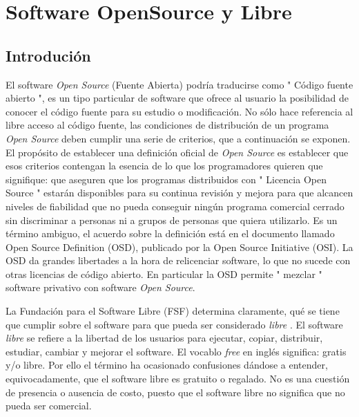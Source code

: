 \chapter{Software OpenSource y Libre}
\section{Introdución} 
	El software \textit{Open Source} (Fuente Abierta) podría traducirse como " Código fuente abierto ", es un tipo particular de software que ofrece al
	usuario la posibilidad de conocer el código fuente para su estudio o modificación. No sólo hace referencia al libre acceso al código fuente, las
	condiciones de distribución de un programa \textit{Open Source} deben cumplir una serie de criterios, que a continuación se exponen. El propósito de
	establecer una definición oficial de \textit{Open Source} es establecer que esos criterios contengan la esencia de lo que los programadores quieren que
	signifique: que aseguren que los programas distribuidos con " Licencia Open Source " estarán disponibles para su continua revisión y mejora para que
	alcancen niveles de fiabilidad que no pueda conseguir ningún programa comercial cerrado sin discriminar a personas ni a grupos de personas que
	quiera utilizarlo. Es un término ambiguo, el acuerdo sobre la definición está en el documento llamado Open Source Definition (OSD), publicado por la
	Open Source Initiative (OSI). La OSD da grandes libertades a la hora de relicenciar software, lo que no sucede con otras licencias de código
	abierto. En particular la OSD permite " mezclar " software privativo con software \textit{Open Source}.
	
	La Fundación para el Software Libre (FSF) determina claramente, qué se tiene que cumplir sobre el software para que pueda ser considerado
	\textit{libre} \cite{Etiqueta07}. El software \textit{libre} se refiere a la libertad de los usuarios para ejecutar, copiar, distribuir, estudiar,
	cambiar y mejorar el software. El vocablo \textit{free} en inglés significa: gratis y/o libre. Por ello el término ha ocasionado confusiones dándose
	a entender, equivocadamente, que el software libre es gratuito o regalado. No es una cuestión de presencia o ausencia de costo, puesto que el
	software libre no significa que no pueda ser comercial.
	

